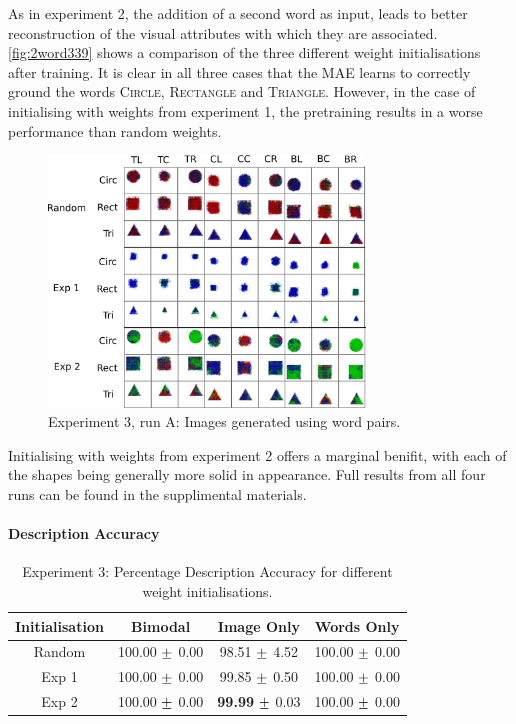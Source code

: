 As in experiment 2, the addition of a second word as input, leads to better reconstruction of the visual attributes with which they are associated. \autoref{fig:2word339} shows a comparison of the three different weight initialisations after training. It is clear in all three cases that the \ac{MAE} learns to correctly ground the words \textsc{Circle}, \textsc{Rectangle} and \textsc{Triangle}. However, in the case of initialising with weights from experiment 1, the pretraining results in a worse performance than random weights.
\begin{figure}[h]
\centering
\includegraphics[width=0.75\textwidth]{Figs/shapes/2word339_pos.png}
\caption{Experiment 3, run A: Images generated using word pairs.}
\label{fig:2word339}
\end{figure}

Initialising with weights from experiment 2 offers a marginal benifit, with each of the shapes being generally more solid in appearance. Full results from all four runs can be found in the supplimental materials.

\paragraph{Description Accuracy}

\begin{table}[h!]
\centering
	\begin{tabular}{|c|c|c|c|}
	\hline
	\textbf{Initialisation} & 	\textbf{Bimodal} & 	\textbf{Image Only} 	& 	\textbf{Words Only} \\ \hline
	Random	&	100.00	$\mypm$	0.00	&	98.51	$\mypm$	4.52	&	100.00	$\mypm$	0.00	\\ \hline
	Exp 1	&	100.00	$\mypm$	0.00	&	99.85	$\mypm$	0.50	&	100.00	$\mypm$	0.00	\\ \hline
	Exp 2	&	100.00	$\mypm$	0.00	&	\textbf{99.99}	$\mypm$ 0.03	&	100.00	$\mypm$	0.00	\\ \hline



	\end{tabular}
\caption{Experiment 3: Percentage Description Accuracy for different weight initialisations. }
\label{tab:res339_acc}
\end{table}

